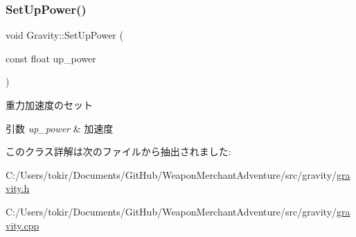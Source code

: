 \subsubsection{\texorpdfstring{Set\+Up\+Power()}{SetUpPower()}}
{\footnotesize\ttfamily void Gravity\+::\+Set\+Up\+Power (\begin{DoxyParamCaption}\item[{const float}]{up\+\_\+power }\end{DoxyParamCaption})\hspace{0.3cm}{\ttfamily [inline]}}



重力加速度のセット 


\begin{DoxyParams}{引数}
{\em up\+\_\+power} & 加速度 \\
\hline
\end{DoxyParams}


このクラス詳解は次のファイルから抽出されました\+:\begin{DoxyCompactItemize}
\item 
C\+:/\+Users/tokir/\+Documents/\+Git\+Hub/\+Weapon\+Merchant\+Adventure/src/gravity/\mbox{\hyperlink{gravity_8h}{gravity.\+h}}\item 
C\+:/\+Users/tokir/\+Documents/\+Git\+Hub/\+Weapon\+Merchant\+Adventure/src/gravity/\mbox{\hyperlink{gravity_8cpp}{gravity.\+cpp}}\end{DoxyCompactItemize}
